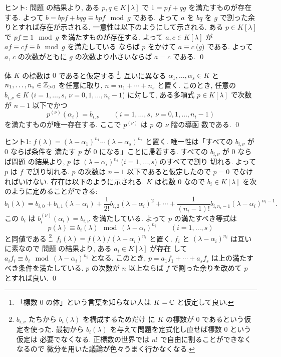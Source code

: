 \documentclass[12pt,twoside]{jarticle}
\begin{document}
\noindent
ヒント: 問題  の結果より, 
ある $p,q\in K[\lambda]$ で $1=pf+qg$ を満たすものが存在する.
よって $b=bpf+bqg\equiv bpf \mod{g}$ である.
よって $a$ を $bq$ を $g$ で割った余りとすれば存在が示される.
一意性は以下のようにして示される.
ある $p\in K[\lambda]$ で $pf\equiv 1\mod{g}$ を満たすものが存在する.
よって $a,c\in K[\lambda]$ が $af\equiv cf\equiv b\mod{g}$ を満たしている
ならば $p$ をかけて $a\equiv c\pod{g}$ である.  
よって $a$, $c$ の次数がともに $g$ の次数より小さいならば $a=c$ である.
\qed

\begin{question}
\label{q:Lagrange-interpolation-4}
  体 $K$ の標数は $0$ であると仮定する%
  \footnote{「標数 $0$ の体」という言葉を知らない人は $K={\mathbb C}$ と仮定して良い.}.
  互いに異なる $\alpha_1,\dots,\alpha_s\in K$ 
  と $n_1,\dots,n_s\in{\mathbb Z}_{>0}$ を任意に取り, $n=n_1+\cdots+n_s$ と置く.
  このとき, 任意の  $b_{i,\nu}\in K$  ($i=1,\dots,s$, $\nu=0,1,\dots,n_i-1$) 
  に対して, ある多項式 $p\in K[\lambda]$ で次数が $n-1$ 以下でかつ
  \begin{equation*}
    p^{(\nu)}(\alpha_i) = b_{i,\nu}
    \qquad (i=1,\dots,s,\; \nu=0,1,\dots,n_i-1)
  \end{equation*}
  を満たすものが唯一存在する.   ここで $p^{(\nu)}$ は $p$ の $\nu$ 階の導函
  数である.  \qed
\end{question}

\noindent
ヒント1: $f(\lambda)=(\lambda-\alpha_1)^{n_1}\cdots(\lambda-\alpha_s)^{n_s}$ 
と置く.  唯一性は「すべての $b_{i,\nu}$ が $0$ ならば条件を
満たす $p$ が $0$ になる」ことに帰着する.  
すべての $b_{i,\nu}$ が $0$ ならば問題  
の結果より, $p$ は $(\lambda-\alpha_i)^{n_i}$ ($i=1,\dots,s$) のすべてで割り
切れる.  よって $p$ は $f$ で割り切れる.
$p$ の次数は $n-1$ 以下であると仮定したので $p=0$ でなければいけない.
存在は以下のように示される.  $K$ は標数 $0$ なので $b_i\in K[\lambda]$ を次
のように定めることができる:
\begin{equation*}
  b_i(\lambda) =
  b_{i,0} + b_{i,1}(\lambda-\alpha_i) 
  + \frac{1}{2!}b_{i,2}(\lambda-\alpha_i)^2 +
  \cdots + \frac{1}{(n_i-1)!}b_{i,n_i-1}(\lambda-\alpha_i)^{n_i-1}.
\end{equation*}
この $b_i$ は $b_i^{(\nu)}(\alpha_i)=b_{i,\nu}$ を満たしている.
よって $p$ の満たすべき等式は
\begin{equation*}
  p(\lambda) \equiv b_i(\lambda) \mod{(\lambda-\alpha_i)^{n_i}}
  \qquad (i=1,\dots,s)
\end{equation*}
と同値である%
\footnote{$b_{i,\nu}$ たちから $b_i(\lambda)$ を構成するためだけ
  に $K$ の標数が $0$ であるという仮定を使った.  
  最初から $b_i(\lambda)$ を与えて問題を定式化し直せば標数 $0$ という仮定は
  必要でなくなる.  正標数の世界では $n!$ で自由に割ることができなくなるので
  微分を用いた議論が色々うまく行かなくなる.}.  
$f_i(\lambda)=f(\lambda)/(\lambda-\alpha_i)^{n_i}$ と置く.
$f_i$ と $(\lambda-\alpha_i)^{n_i}$ は互いに素なので
問題  の結果より, 
ある $a_i\in K[\lambda]$ が存在
して $a_if_i\equiv b_i\mod{(\lambda-\alpha_i)^{n_i}}$ となる.
このとき, $p=a_1f_1+\cdots+a_sf_s$ は上の満たすべき条件を満たしている.  
$p$ の次数が $n$ 以上ならば $f$ で割った余りを改めて $p$ とすれば良い.
\qed
\end{document}
